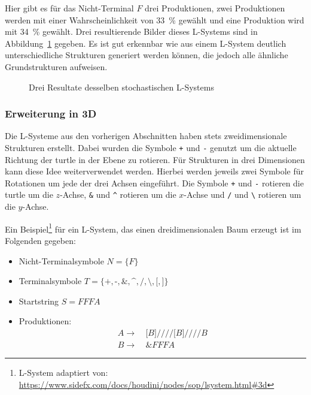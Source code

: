 Hier gibt es für das Nicht-Terminal $F$ drei Produktionen, zwei Produktionen werden mit einer Wahrscheinlichkeit von \SI{33}{\percent} gewählt und eine Produktion wird mit \SI{34}{\percent} gewählt.
Drei resultierende Bilder dieses L-Systems sind in Abbildung~\ref{fig:Stochastic} gegeben.
Es ist gut erkennbar wie aus einem L-System deutlich unterschiedliche Strukturen generiert werden können, die jedoch alle ähnliche Grundstrukturen aufweisen.
\begin{figure}[ht]
    \begin{subfigure}[t]{.25\textwidth}
        \centering
        
    \end{subfigure}
    \hfill
    \begin{subfigure}[t]{.25\textwidth}
        \centering
        
    \end{subfigure}
    \hfill
    \begin{subfigure}[t]{.25\textwidth}
        \centering
        
    \end{subfigure}
    \caption{Drei Resultate desselben stochastischen L-Systems}\label{fig:Stochastic}
\end{figure}


\subsubsection{Erweiterung in 3D}\label{subsub: L-System 3D}
Die L-Systeme aus den vorherigen Abschnitten haben stets zweidimensionale Strukturen erstellt.
Dabei wurden die Symbole \texttt{+} und \texttt{-} genutzt um die aktuelle Richtung der turtle in der Ebene zu rotieren.
Für Strukturen in drei Dimensionen kann diese Idee weiterverwendet werden.
Hierbei werden jeweils zwei Symbole für Rotationen um jede der drei Achsen eingeführt.
Die Symbole \texttt{+} und \texttt{-} rotieren die turtle um die $z$-Achse, \texttt{\&} und \texttt{\textasciicircum} rotieren um die $x$-Achse und \texttt{/} und \texttt{\textbackslash} rotieren um die $y$-Achse.

Ein Beispiel\footnote{L-System adaptiert von: \url{https://www.sidefx.com/docs/houdini/nodes/sop/lsystem.html\#3d}} für ein L-System, das einen dreidimensionalen Baum erzeugt ist im Folgenden gegeben:
\begin{itemize}
    \item Nicht-Terminalsymbole $N=\{F\}$
    \item Terminalsymbole $T=\{\texttt{+},\texttt{-},\texttt{\&},\texttt{\textasciicircum},\texttt{/},\texttt{\textbackslash},\texttt{[},\texttt{]}\}$
    \item Startstring $S=FFFA$
    \item Produktionen:
          \begin{align*}
              A\rightarrow & ~\texttt{[}B\texttt{]////[}B\texttt{]////}B \\
              B\rightarrow & ~\texttt{\&}FFFA
          \end{align*}
\end{itemize}

